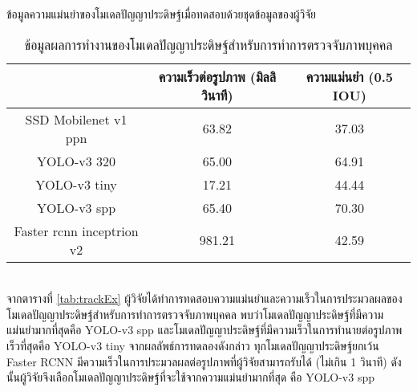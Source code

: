 ข้อมูลความแม่นยำของโมเดลปัญญาประดิษฐ์เมื่อทดสอบด้วยชุดข้อมูลของผู้วิจัย
\begin{table}[!ht]
	\centering
	\begin{tabular}{|c|c|c|}
			\hline 
			{}&{ความเร็วต่อรูปภาพ (มิลลิวินาที)}&{ความแม่นยำ (0.5 IOU)}			\\
			\hline
			SSD Mobilenet v1 ppn	 					& 63.82 		& 37.03			\\
			YOLO-v3 320							& 65.00		& 64.91		\\
			YOLO-v3 tiny							& 17.21		& 44.44			\\
			YOLO-v3 spp							& 65.40		& 70.30			\\	
			Faster rcnn inceptrion v2					& 981.21		& 42.59		\\
		\hline
	\end{tabular}
	\caption{ข้อมูลผลการทำงานของโมเดลปัญญาประดิษฐ์สำหรับการทำการตรวจจับภาพบุคคล}
    \label{tab:origina_detectEx}
\end{table}
\\
จากตารางที่ \ref{tab:trackEx} ผู้วิจัยได้ทำการทดสอบความแม่นยำและความเร็วในการประมวลผลของโมเดลปัญญาประดิษฐ์สำหรับการทำการตรวจจับภาพบุคคล 
พบว่าโมเดลปัญญาประดิษฐ์ที่มีความแม่นยำมากที่สุดคือ YOLO-v3 spp และโมเดลปัญญาประดิษฐ์ที่มีความเร็วในการทำนายต่อรูปภาพเร็วที่สุดคือ YOLO-v3 tiny จากผลลัพธ์การทดลองดังกล่าว 
ทุกโมเดลปัญญาประดิษฐ์ยกเว้น Faster RCNN มีความเร็วในการประมวลผลต่อรูปภาพที่ผู้วิจัยสามารถรับได้ (ไม่เกิน 1 วินาที) 
ดังนั้นผู้วิจัยจึงเลือกโมเดลปัญญาประดิษฐ์ที่จะใช้จากความแม่นยำมากที่สุด คือ YOLO-v3 spp